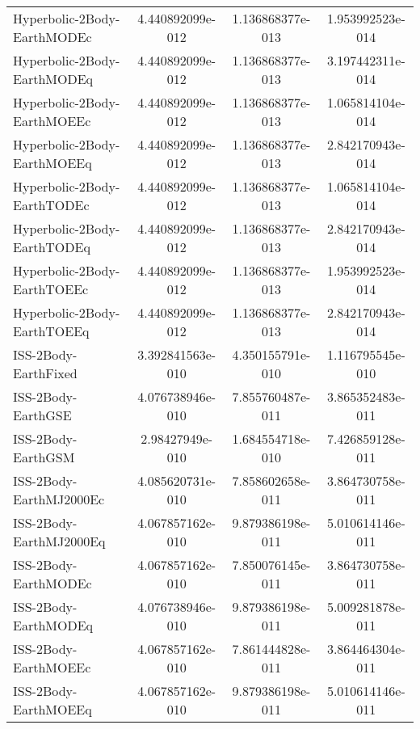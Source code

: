 \begin{table}[htbp!]
\begin{tabular}{lccc}
         Hyperbolic-2Body-EarthMODEc & 4.440892099e-012 & 1.136868377e-013 & 1.953992523e-014 \\
         Hyperbolic-2Body-EarthMODEq & 4.440892099e-012 & 1.136868377e-013 & 3.197442311e-014 \\
         Hyperbolic-2Body-EarthMOEEc & 4.440892099e-012 & 1.136868377e-013 & 1.065814104e-014 \\
         Hyperbolic-2Body-EarthMOEEq & 4.440892099e-012 & 1.136868377e-013 & 2.842170943e-014 \\
         Hyperbolic-2Body-EarthTODEc & 4.440892099e-012 & 1.136868377e-013 & 1.065814104e-014 \\
         Hyperbolic-2Body-EarthTODEq & 4.440892099e-012 & 1.136868377e-013 & 2.842170943e-014 \\
         Hyperbolic-2Body-EarthTOEEc & 4.440892099e-012 & 1.136868377e-013 & 1.953992523e-014 \\
         Hyperbolic-2Body-EarthTOEEq & 4.440892099e-012 & 1.136868377e-013 & 2.842170943e-014 \\
         ISS-2Body-EarthFixed & 3.392841563e-010 & 4.350155791e-010 & 1.116795545e-010 \\
         ISS-2Body-EarthGSE & 4.076738946e-010 & 7.855760487e-011 & 3.865352483e-011 \\
         ISS-2Body-EarthGSM & 2.98427949e-010 & 1.684554718e-010 & 7.426859128e-011 \\
         ISS-2Body-EarthMJ2000Ec & 4.085620731e-010 & 7.858602658e-011 & 3.864730758e-011 \\
         ISS-2Body-EarthMJ2000Eq & 4.067857162e-010 & 9.879386198e-011 & 5.010614146e-011 \\
         ISS-2Body-EarthMODEc & 4.067857162e-010 & 7.850076145e-011 & 3.864730758e-011 \\
         ISS-2Body-EarthMODEq & 4.076738946e-010 & 9.879386198e-011 & 5.009281878e-011 \\
         ISS-2Body-EarthMOEEc & 4.067857162e-010 & 7.861444828e-011 & 3.864464304e-011 \\
         ISS-2Body-EarthMOEEq & 4.067857162e-010 & 9.879386198e-011 & 5.010614146e-011 \\

\end{tabular}
\end{table}
